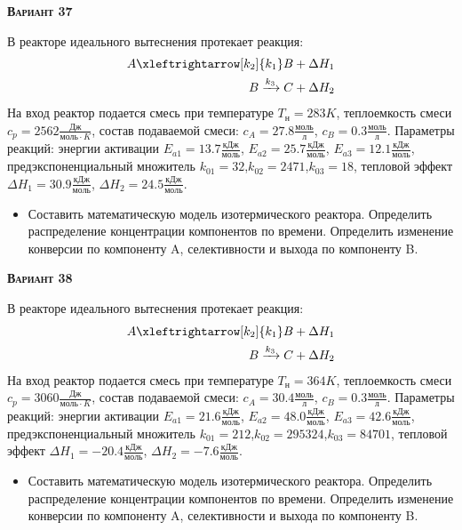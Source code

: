 \textsc{\textbf{Вариант 37}}

 В реакторе идеального вытеснения протекает реакция: \begin{equation*} \begin{aligned} A \xleftrightarrow[k_2]{k_1} B + \Delta H_1 \\ B \xrightarrow{k_3} C + \Delta H_2 \end{aligned} \end{equation*}                              На вход  реактор подается смесь при температуре $ T_{н} =  283 K$, теплоемкость смеси $c_p= 2562 \frac{Дж}{моль \cdot K}$, состав подаваемой смеси: $c_A=27.8 \frac{моль}{л}$, $c_B=0.3 \frac{моль}{л}$. Параметры реакций: энергии активации $E_{a1}=13.7 \frac{кДж}{моль}$, $E_{a2}=25.7  \frac{кДж}{моль}$, $E_{a3}=12.1  \frac{кДж}{моль}$, предэкспоненциальный множитель $k_{01}=        32$,$k_{02}=      2471$,$k_{03}=        18$, тепловой эффект $\Delta H_1= 30.9  \frac{кДж}{моль}$, $\Delta H_2=24.5 \frac{кДж}{моль}$.\begin{itemize} \item Составить математическую модель изотермического реактора. Определить распределение концентрации компонентов по времени. Определить изменение конверсии по компоненту A, селективности и выхода по компоненту B. \end{itemize}

\textsc{\textbf{Вариант 38}}

 В реакторе идеального вытеснения протекает реакция: \begin{equation*} \begin{aligned} A \xleftrightarrow[k_2]{k_1} B + \Delta H_1 \\ B \xrightarrow{k_3} C + \Delta H_2 \end{aligned} \end{equation*}                              На вход  реактор подается смесь при температуре $ T_{н} =  364 K$, теплоемкость смеси $c_p= 3060 \frac{Дж}{моль \cdot K}$, состав подаваемой смеси: $c_A=30.4 \frac{моль}{л}$, $c_B=0.3 \frac{моль}{л}$. Параметры реакций: энергии активации $E_{a1}=21.6 \frac{кДж}{моль}$, $E_{a2}=48.0  \frac{кДж}{моль}$, $E_{a3}=42.6  \frac{кДж}{моль}$, предэкспоненциальный множитель $k_{01}=       212$,$k_{02}=    295324$,$k_{03}=     84701$, тепловой эффект $\Delta H_1= -20.4  \frac{кДж}{моль}$, $\Delta H_2=-7.6 \frac{кДж}{моль}$.\begin{itemize} \item Составить математическую модель изотермического реактора. Определить распределение концентрации компонентов по времени. Определить изменение конверсии по компоненту A, селективности и выхода по компоненту B. \end{itemize}


